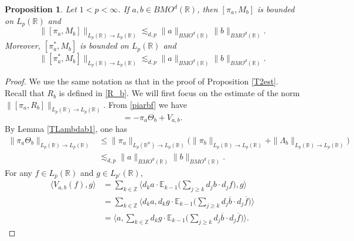 \documentclass[oneside,english,a4wide]{amsart}
\numberwithin{equation}{section}
\numberwithin{figure}{section}
\theoremstyle{plain}
\theoremstyle{plain}
\newtheorem{proposition}[thm]{Proposition}
\theoremstyle{definition}
\theoremstyle{plain}
\theoremstyle{remark}
\theoremstyle{definition}
\theoremstyle{remark}
\theoremstyle{definition}
\newcommand{\8}{\infty}
\begin{document}
\begin{proposition}\label{T1est}
	Let $1<p<\infty$. If $a,b\in BMO^d(\mathbb{R})$, then $[\pi_a,M_b]$ is bounded on $L_p(\mathbb{R})$ and
	\begin{equation*}
		\|[\pi_a,M_b]\|_{L_p(\mathbb{R})\to L_p(\mathbb{R})}\lesssim_{d,p} \|a\|_{BMO^d(\mathbb{R})} \|b\|_{BMO^d(\mathbb{R})}.
	\end{equation*}
Moreover, $[\pi_a^*,M_b]$ is bounded on $L_p(\mathbb{R})$ and
\begin{equation*}
	\|[\pi_a^*,M_b]\|_{L_p(\mathbb{R})\to L_p(\mathbb{R})}\lesssim_{d,p} \|a\|_{BMO^d(\mathbb{R})}\|b\|_{BMO^d(\mathbb{R})}.
\end{equation*}
\end{proposition}
\begin{proof}
	We use the same notation as that in the proof of Proposition \ref{T2est}. 
	Recall that $R_b$ is defined in \eqref{R_b}. We will first focus on the estimate of the norm $\|[\pi_{a}, R_b]\|_{L_p(\mathbb{R})\to L_p(\mathbb{R})}$. From \eqref{piarbf} we have
	\begin{equation*}
		[\pi_{a}, R_b]=-\pi_{a}\Theta_b+V_{a,b}.
	\end{equation*}
	By Lemma \ref{TLambdab1}, one has
	\begin{equation}\label{a1}
		\begin{aligned}
			\|\pi_{a}\Theta_{b}\|_{L_p(\mathbb{R})\to L_p(\mathbb{R})}{}&\le \|\pi_{a}\|_{L_p(\mathbb{R}^n)\to L_p(\mathbb{R})}\bigl(\|\pi_{b}\|_{L_p(\mathbb{R})\to L_p(\mathbb{R})}+\|\varLambda_{b}\|_{L_p(\mathbb{R})\to L_p(\mathbb{R})}\bigr)\\
			&\lesssim_{d,p} \|a\|_{BMO^d(\mathbb{R})}\|b\|_{BMO^d(\mathbb{R})}.
		\end{aligned}
	\end{equation}
	For any $f\in L_p(\mathbb{R})$ and $g\in L_{p'}(\mathbb{R})$, 
	\begin{equation*}
		\begin{aligned}
			\langle V_{a,b}(f),g\rangle{}&=\sum_{k\in\mathbb{Z}}\biggl\langle d_ka\cdot \mathbb{E}_{k-1}\biggl(\sum_{j\ge k}d_jb\cdot d_jf\biggr),g\biggr\rangle\\
			&=\sum_{k\in\mathbb{Z}}\biggl\langle d_ka,d_kg\cdot \mathbb{E}_{k-1}\biggl(\sum_{j\ge k}d_j\overline{b}\cdot d_j\overline{f}\biggr)\biggr\rangle\\
			&= \biggl\langle a,\sum_{k\in\mathbb{Z}}d_kg\cdot \mathbb{E}_{k-1}\biggl(\sum_{j\ge k}d_j\overline{b}\cdot d_j\overline{f}\biggr)\biggr\rangle.
		\end{aligned}

\end{equation*}
\end{proof}
\end{document}
